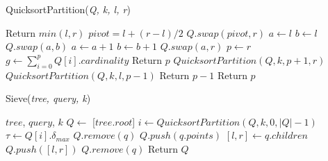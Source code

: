 \begin{algorithm} %
    \caption{QuicksortPartition(\emph{Q, k, l, r})} %
    \label{alg:quicksort-partition} %
    \begin{algorithmic}[5] %
            \STATE Return $min(l, r)$
        \ELSE 
            \STATE $pivot = l + (r - l) / 2$
            \STATE $Q.swap(pivot, r)$
            \STATE $a \leftarrow l$
            \STATE $b \leftarrow l$
                    \STATE $Q.swap(a, b)$
                    \STATE $a \leftarrow a + 1$
                \ENDIF
                \STATE $b \leftarrow b + 1$
            \ENDWHILE
            \STATE $Q.swap(a, r)$
            \STATE $p \leftarrow r$
            \STATE $g \leftarrow \sum_{i=0}^{p} Q[i].cardinality$
                \STATE Return $p$
                \STATE $QuicksortPartition(Q, k, p + 1, r)$
            \ELSE 
                    \STATE $QuicksortPartition(Q, k, l, p - 1)$
                    \STATE Return $p - 1$
                \ELSE
                    \STATE Return $p$
                \ENDIF
            \ENDIF
        \ENDIF
    \end{algorithmic}
    \end{algorithm}

\begin{algorithm} %
    \caption{Sieve(\emph{tree, query, k})} %
    \label{alg:sieve} %
    \begin{algorithmic}[6] %
        \REQUIRE $tree$, $query$, $k$
        \STATE $Q \leftarrow$ [$tree.root$]
            \STATE $i \leftarrow QuicksortPartition(Q, k, 0, |Q| - 1)$
            \STATE $\tau \leftarrow Q[i].\delta_{max}$
                    \STATE $Q.remove(q)$
                \ENDIF
            \ENDFOR
                    \STATE $Q.push(q.points)$
                \ELSE
                    \STATE $[l, r] \leftarrow q.children$
                    \STATE $Q.push([l, r])$   
                \ENDIF
                \STATE $Q.remove(q)$
            \ENDFOR 
        \ENDWHILE
        \STATE Return $Q$
    \end{algorithmic}
    \end{algorithm}

